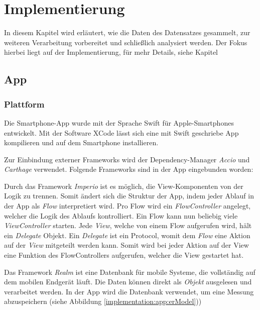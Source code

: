 \chapter{Implementierung}
\label{ch:Implementierung}

In diesem Kapitel wird erläutert, wie die Daten des Datensatzes gesammelt, zur weiteren Verarbeitung vorbereitet und schließlich analysiert werden.
Der Fokus hierbei liegt auf der Implementierung, für mehr Details, siehe Kapitel  %

\section{App}
\label{ch:Implementierung:app}
\subsection{Plattform}
\label{ch:Implementierung:app:platform}
Die Smartphone-App wurde mit der Sprache Swift für Apple-Smartphones entwickelt. 
Mit der Software XCode lässt sich eine mit Swift geschriebe App kompilieren und auf dem Smartphone installieren.

Zur Einbindung externer Frameworks wird der Dependency-Manager \textit{Accio} und \textit{Carthage} verwendet.
Folgende Frameworks sind in der App eingebunden worden:

Durch das Framework \textit{Imperio} ist es möglich, die View-Komponenten von der Logik zu trennen. 
Somit ändert sich die Struktur der App, indem jeder Ablauf in der App als \textit{Flow} interpretiert wird. 
Pro Flow wird ein \textit{FlowController} angelegt, welcher die Logik des Ablaufs kontrolliert. 
Ein Flow kann nun beliebig viele \textit{ViewController} starten.
Jede \textit{View}, welche von einem Flow aufgerufen wird, hält ein \textit{Delegate} Objekt.
Ein \textit{Delegate} ist ein Protocol, womit dem \textit{Flow} eine Aktion auf der \textit{View} mitgeteilt werden kann.
Somit wird bei jeder Aktion auf der View eine Funktion des FlowControllers aufgerufen, welcher die View gestartet hat.


Das Framework \textit{Realm} ist eine Datenbank für mobile Systeme, die vollständig auf dem mobilen Endgerät läuft.
Die Daten können direkt als \textit{Objekt} ausgelesen und verarbeitet werden.
In der App wird die Datenbank verwendet, um eine Messung abzuspeichern (siehe Abbildung \ref{implementation:app:erModel}))

